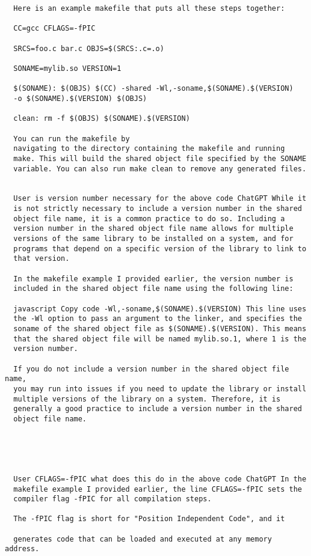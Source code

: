 \documentclass{article}
\begin{document}
\begin{Verbatim}
  Here is an example makefile that puts all these steps together:

  CC=gcc CFLAGS=-fPIC

  SRCS=foo.c bar.c OBJS=$(SRCS:.c=.o)

  SONAME=mylib.so VERSION=1

  $(SONAME): $(OBJS) $(CC) -shared -Wl,-soname,$(SONAME).$(VERSION)
  -o $(SONAME).$(VERSION) $(OBJS)

  clean: rm -f $(OBJS) $(SONAME).$(VERSION)

  You can run the makefile by
  navigating to the directory containing the makefile and running
  make. This will build the shared object file specified by the SONAME
  variable. You can also run make clean to remove any generated files.


  User is version number necessary for the above code ChatGPT While it
  is not strictly necessary to include a version number in the shared
  object file name, it is a common practice to do so. Including a
  version number in the shared object file name allows for multiple
  versions of the same library to be installed on a system, and for
  programs that depend on a specific version of the library to link to
  that version.

  In the makefile example I provided earlier, the version number is
  included in the shared object file name using the following line:

  javascript Copy code -Wl,-soname,$(SONAME).$(VERSION) This line uses
  the -Wl option to pass an argument to the linker, and specifies the
  soname of the shared object file as $(SONAME).$(VERSION). This means
  that the shared object file will be named mylib.so.1, where 1 is the
  version number.

  If you do not include a version number in the shared object file name,
  you may run into issues if you need to update the library or install
  multiple versions of the library on a system. Therefore, it is
  generally a good practice to include a version number in the shared
  object file name.





  User CFLAGS=-fPIC what does this do in the above code ChatGPT In the
  makefile example I provided earlier, the line CFLAGS=-fPIC sets the
  compiler flag -fPIC for all compilation steps.

  The -fPIC flag is short for "Position Independent Code", and it
  
  generates code that can be loaded and executed at any memory address.
  

\end{Verbatim}
\end{document}
